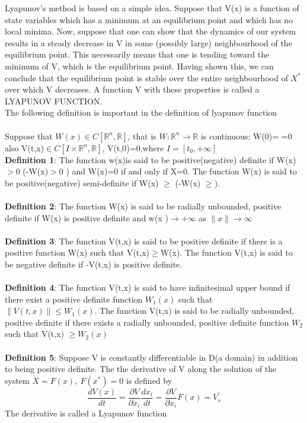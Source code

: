 \documentclass[a4paper,12pt]{report}
\numberwithin{equation}{section}
\begin{document}
Lyapunov's method is based on a simple idea. Suppose that V(x) is a function of state variables which has a minimum at an equilibrium point and which has no local minima. Now, suppose that one can show that the dynamics of our system results in a steady decrease in V in some (possibly large) neighbourhood of the equilibrium point. This necessarily means that one is tending toward the minimum of V, which is the equilibrium point. Having shown this, we can conclude that the equilibrium point is stable over the entire neighbourhood of $ X^*$ over which V decreases. A function V with these properties is called a LYAPUNOV FUNCTION.\\
The following definition is important in the definition of lyapunov function \\
\\
Suppose that $W(x)\in C[\mathbb{R}^n,\mathbb{R}]$, that is $W:\mathbb{R}^n \to \mathbb{R}$ is continuous; W(0)= =0 also V(t,x)$\in C[I\times \mathbb{R}^n,\mathbb{R}]$, V(t,0)=0,where $I=[t_0,+\infty]$\\
\textbf{Definition 1}: The function w(x)is said to be positive(negative) definite if W(x)$>0$ (-W(x)$>0$ ) and W(x)=0 if and only if X=0. The function W(x) is said to be positive(negative) semi-definite if W(x) $\geq$ (-W(x) $\geq$). \\  \\
\textbf{Definition 2}: The function W(x) is said to be   radially unbounded, positive definite if W(x)   is positive definite and w(x )$\to +\infty$ as  $\| x \| \to \infty$ \\ \\
\textbf{Definition 3}: The function V(t,x) is said to be positive definite if there is a positive function W(x) such that V(t,x)$\geq$W(x). The function V(t,x) is said to be negative definite if -V(t,x) is positive definite. \\ \\
\textbf{Definition 4}: The function V(t,x) is said to have infinitesimal upper bound if there exist a positive definite function  $W_{1}(x)$ such that $ \| V(t,x) \| \leq W_{1}(x)$. The function V(t,x) is said to be radially unbounded, positive definite if there exists a radially unbounded, positive definite function $W_{2}$ such that V(t,x) $\geq W_{2}(x)$ \\ \\
\textbf{Definition 5}: Suppose V is constantly differentiable in D(a domain) in addition to being positive definite. The the derivative of V along the solution of the system $\dot{X}=F(x),\ F(x^*)= 0$ is defined by 
\begin{equation}
\frac{dV(x)}{dt}= \frac{\partial V}{\partial x_i} \frac{dx_i}{dt}= \frac{\partial V}{\partial x_i} F(x)=V^{\prime}_s 
\end{equation}
The derivative is called a Lyapunov function 
\end{document}
